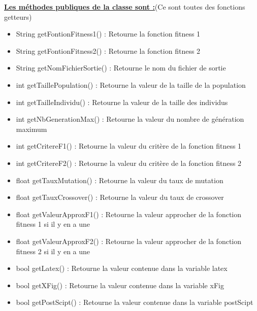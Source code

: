 \documentclass[a4paper,11pt]{article}
\begin{document}
			\underline{\bf Les méthodes publiques de la classe sont :}(Ce sont toutes des fonctions getteurs)\\
			\begin{itemize}
				\item String getFontionFitness1() : Retourne la fonction fitness 1
				\item String getFontionFitness2() : Retourne la fonction fitness 2
				\item String getNomFichierSortie() : Retourne le nom du fichier de sortie
				\item int getTaillePopulation() : Retourne la valeur de la taille de la population
				\item int getTailleIndividu() : Retourne la valeur de la taille des individus
				\item int getNbGenerationMax() : Retourne la valeur du nombre de génération maximum
				\item int getCritereF1() : Retourne la valeur du critère de la fonction fitness 1
				\item int getCritereF2() : Retourne la valeur du critère de la fonction fitness 2
				\item float getTauxMutation() : Retourne la valeur du taux de mutation
				\item float getTauxCrossover() : Retourne la valeur du taux de crossover
				\item float getValeurApproxF1() : Retourne la valeur approcher de la fonction fitness 1 si il y en a une
				\item float getValeurApproxF2() : Retourne la valeur approcher de la fonction fitness 2 si il y en a une
				\item bool getLatex() : Retourne la valeur contenue dans la variable latex
				\item bool getXFig() : Retourne la valeur contenue dans la variable  xFig
				\item bool getPostScipt() : Retourne la valeur contenue dans la variable  postScipt\\
			\end{itemize}
		
		
\end{document}

